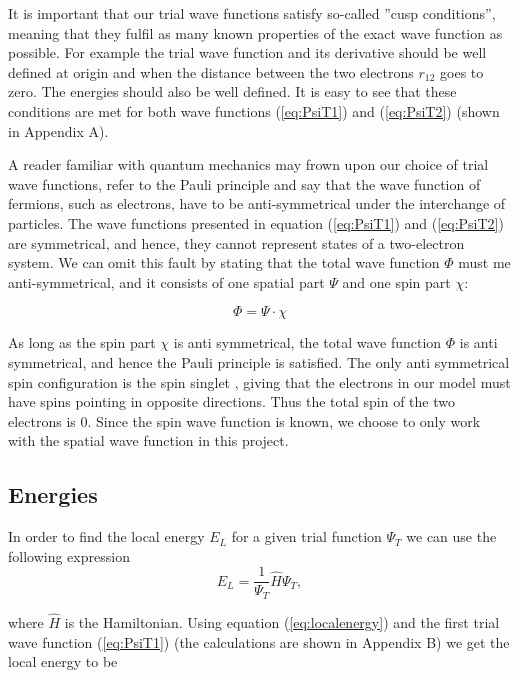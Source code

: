 \documentclass[norsk,a4paper,12pt]{article}
\begin{document}
It is important that our trial wave functions satisfy so-called ''cusp conditions'', meaning that they fulfil as many known properties of the exact wave function as possible. For example the trial wave function and its derivative should be well defined at origin and when the distance between the two electrons $r_{12}$ goes to zero. The energies should also be well defined. It is easy to see that these conditions are met for both wave functions (\ref{eq:PsiT1}) and (\ref{eq:PsiT2}) (shown in Appendix A).

A reader familiar with quantum mechanics may frown upon our choice of trial wave functions, refer to the Pauli principle and say that the wave function of fermions, such as electrons, have to be anti-symmetrical under the interchange of particles. The wave functions presented in equation (\ref{eq:PsiT1}) and (\ref{eq:PsiT2}) are symmetrical, and hence, they cannot represent states of a two-electron system. We can omit this fault by stating that the total wave function $\Phi$ must me anti-symmetrical, and it consists of one spatial part $\Psi$ and one spin part $\chi$:

\begin{equation}
    \Phi = \Psi \cdot \chi 
\end{equation}

As long as the spin part $\chi$ is anti symmetrical, the total wave function $\Phi$ is anti symmetrical, and hence the Pauli principle is satisfied. The only anti symmetrical spin configuration is the spin singlet \cite{Griffiths}, giving that the electrons in our model must have spins pointing in opposite directions. Thus the total spin of the two electrons is 0. Since the spin wave function is known, we choose to only work with the spatial wave function in this project.

\subsection{Energies} \label{Energies}
In order to find the local energy $E_L$ for a given trial function $\Psi_T$ we can use the following expression
\begin{equation}
E_L = \frac{1}{\Psi_T}\hat{H}\Psi_T,
\label{eq:localenergy}
\end{equation}

where $\hat{H}$ is the Hamiltonian. Using equation (\ref{eq:localenergy}) and the first trial wave function (\ref{eq:PsiT1}) (the calculations are shown in Appendix B) we get the local energy to be
\end{document}
